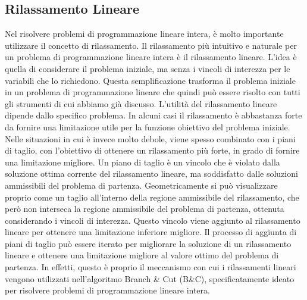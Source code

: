 \subsection{Rilassamento Lineare}

Nel risolvere problemi di programmazione lineare intera, è molto importante utilizzare il concetto di rilassamento. Il
rilassamento più intuitivo e naturale per un problema di programmazione lineare intera è il rilassamento lineare. L'idea
è quella di considerare il problema iniziale, ma senza i vincoli di interezza per le variabili che lo richiedono.
Questa semplificazione trasforma il problema iniziale in un problema di programmazione lineare che quindi può essere
risolto con tutti gli strumenti di cui abbiamo già discusso. L'utilità del rilassamento lineare dipende dallo specifico
problema. In alcuni casi il rilassamento è abbastanza forte da fornire una limitazione utile per la funzione obiettivo
del problema iniziale. Nelle situazioni in cui è invece molto debole, viene spesso combinato con i piani di taglio, con
l'obiettivo di ottenere un rilassamento più forte, in grado di fornire una limitazione migliore. Un piano di taglio è un
vincolo che è violato dalla soluzione ottima corrente del rilassamento lineare, ma soddisfatto dalle soluzioni
ammissibili del problema di partenza. Geometricamente si può visualizzare proprio come un taglio all'interno della
regione ammissibile del rilassamento, che però non interseca la regione ammissibile del problema di partenza, ottenuta
considerando i vincoli di interezza. Questo vincolo viene aggiunto al rilassamento lineare per ottenere una limitazione
inferiore migliore. Il processo di aggiunta di piani di taglio può essere iterato per migliorare la soluzione di un
rilassamento lineare e ottenere una limitazione migliore al valore ottimo del problema di partenza. In effetti, questo
è proprio il meccanismo con cui i rilassamenti lineari vengono utilizzati nell'algoritmo Branch \& Cut (B\&C),
specificatamente ideato per risolvere problemi di programmazione lineare intera.

